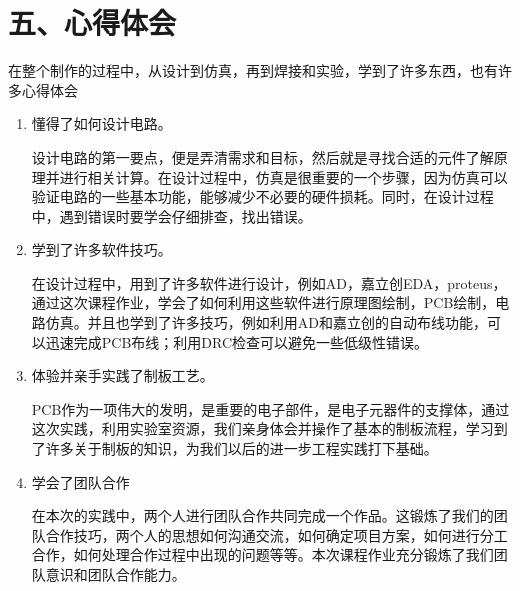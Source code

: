\documentclass[a4paper,12pt]{article}
\begin{document}
	\section*{五、心得体会}
	在整个制作的过程中，从设计到仿真，再到焊接和实验，学到了许多东西，也有许多心得体会
	\begin{enumerate}
		\item 懂得了如何设计电路。\par 
		\qquad 设计电路的第一要点，便是弄清需求和目标，然后就是寻找合适的元件了解原理并进行相关计算。在设计过程中，仿真是很重要的一个步骤，因为仿真可以验证电路的一些基本功能，能够减少不必要的硬件损耗。同时，在设计过程中，遇到错误时要学会仔细排查，找出错误。
		\item 学到了许多软件技巧。\par 
		\qquad 在设计过程中，用到了许多软件进行设计，例如AD，嘉立创EDA，proteus，通过这次课程作业，学会了如何利用这些软件进行原理图绘制，PCB绘制，电路仿真。并且也学到了许多技巧，例如利用AD和嘉立创的自动布线功能，可以迅速完成PCB布线；利用DRC检查可以避免一些低级性错误。
		\item 体验并亲手实践了制板工艺。\par 
		\qquad PCB作为一项伟大的发明，是重要的电子部件，是电子元器件的支撑体，通过这次实践，利用实验室资源，我们亲身体会并操作了基本的制板流程，学习到了许多关于制板的知识，为我们以后的进一步工程实践打下基础。
		\item 学会了团队合作 \par 
		\qquad 在本次的实践中，两个人进行团队合作共同完成一个作品。这锻炼了我们的团队合作技巧，两个人的思想如何沟通交流，如何确定项目方案，如何进行分工合作，如何处理合作过程中出现的问题等等。本次课程作业充分锻炼了我们团队意识和团队合作能力。
	\end{enumerate}
\end{document}
